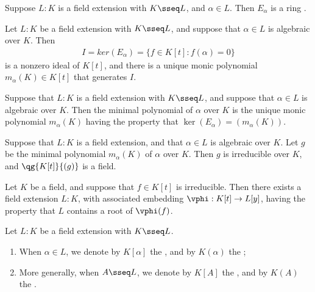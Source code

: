 \documentclass{article}
\begin{document}
  \begin{tproposition}
    Suppose $L: K$ is a field extension with $K \sseq L$, and $\alpha\in L$.
     Then $E_\alpha$ is a ring \homo.
  \end{tproposition}

  \begin{tproposition}
    Let $L : K$ be a field extension with $K \sseq L$, and suppose that $\alpha\in L$ is algebraic over $K$.
    Then \begin{align*}
      I = ker(E_\alpha) = \{f \in K[t] : f(\alpha) = 0\}
    \end{align*}
    is a nonzero ideal of $K[t]$, and there is a unique monic polynomial $m_\alpha(K) \in K[t]$ that generates $I$.
  \end{tproposition}

  \begin{tdefinition}
    Suppose that $L : K$ is a field extension with $K \sseq L$, and suppose that $\alpha\in L$ is algebraic over $K$.
    Then the minimal polynomial of $ \alpha $ over $K$ is the unique monic polynomial $m_\alpha(K)$ having the property that $ \ker(E_\alpha) = (m_\alpha(K))$.
  \end{tdefinition}

  \begin{ttheorem}
    Suppose that $L : K$ is a field extension, and that $\alpha\in L $ is algebraic over $K$.
    Let $g$ be the minimal polynomial $m_\alpha(K)$ of $ \alpha $ over $ K $.
    Then $ g $ is irreducible over $ K $, and $\qg{K[t]}{(g)}$ is a field.
  \end{ttheorem}

  \begin{ttheorem}
    Let $ K $ be a field, and suppose that $ f\in K[t] $ is irreducible.
    Then there exists a field extension $ L:K $, with associated embedding $ \vphi:K[t]\to L[y] $, having the property that $ L $ contains a root of $ \vphi(f) $.
  \end{ttheorem}

  \begin{tdefinition}
    Let $ L:K $ be a field extension with $ K\sseq L $.
    \begin{enumerate}[label=(\roman*)]
      \item When $\alpha\in L$, we denote by $K[\alpha]$ the , and by $K(\alpha)$ the ;
      \item More generally, when $A\sseq L$, we denote by $K[A]$ the , and by $K(A)$ the .
    \end{enumerate}
  \end{tdefinition}
\end{document}
